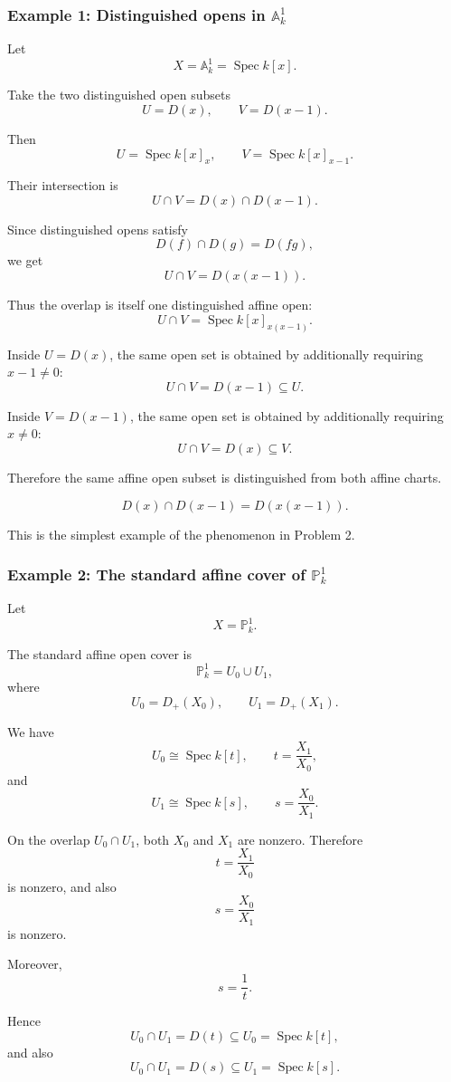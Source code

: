 \documentclass[12pt,a4paper]{article}
\DeclareMathOperator{\Spec}{Spec}
\providecommand{\Spec}{\operatorname{Spec}}
\providecommand{\A}{\mathbb A}
\theoremstyle{notespace}
\begin{document}
\subsubsection*{Example 1: Distinguished opens in \(\A^1_k\)}

Let
\[
X=\A^1_k=\Spec k[x].
\]

Take the two distinguished open subsets
\[
U=D(x),
\qquad
V=D(x-1).
\]

Then
\[
U=\Spec k[x]_x,
\qquad
V=\Spec k[x]_{x-1}.
\]

Their intersection is
\[
U\cap V
=
D(x)\cap D(x-1).
\]

Since distinguished opens satisfy
\[
D(f)\cap D(g)=D(fg),
\]
we get
\[
U\cap V=D(x(x-1)).
\]

Thus the overlap is itself one distinguished affine open:
\[
U\cap V=\Spec k[x]_{x(x-1)}.
\]

Inside \(U=D(x)\), the same open set is obtained by additionally requiring \(x-1\neq 0\):
\[
U\cap V=D(x-1)\subseteq U.
\]

Inside \(V=D(x-1)\), the same open set is obtained by additionally requiring \(x\neq 0\):
\[
U\cap V=D(x)\subseteq V.
\]

Therefore the same affine open subset is distinguished from both affine charts.

\[
\boxed{
	D(x)\cap D(x-1)=D(x(x-1)).
}
\]

This is the simplest example of the phenomenon in Problem 2.

\subsubsection*{Example 2: The standard affine cover of \(\mathbb P^1_k\)}

Let
\[
X=\mathbb P^1_k.
\]

The standard affine open cover is
\[
\mathbb P^1_k=U_0\cup U_1,
\]
where
\[
U_0=D_+(X_0),
\qquad
U_1=D_+(X_1).
\]

We have
\[
U_0\cong \Spec k[t],
\qquad
t=\frac{X_1}{X_0},
\]
and
\[
U_1\cong \Spec k[s],
\qquad
s=\frac{X_0}{X_1}.
\]

On the overlap \(U_0\cap U_1\), both \(X_0\) and \(X_1\) are nonzero. Therefore
\[
t=\frac{X_1}{X_0}
\]
is nonzero, and also
\[
s=\frac{X_0}{X_1}
\]
is nonzero.

Moreover,
\[
s=\frac{1}{t}.
\]

Hence
\[
U_0\cap U_1
=
D(t)\subseteq U_0=\Spec k[t],
\]
and also
\[
U_0\cap U_1
=
D(s)\subseteq U_1=\Spec k[s].
\]
\end{document}
